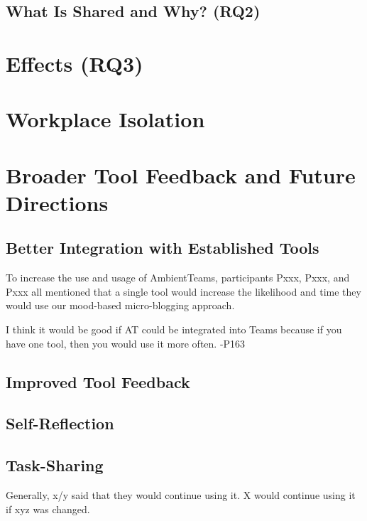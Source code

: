 \subsection{What Is Shared and Why? (RQ2)}





\section{Effects (RQ3)}
\label{section:effects}

\section{Workplace Isolation}
\label{section:workplace_isolation}

\section{Broader Tool Feedback and Future Directions}
\label{section:feedback_future_directions}

\subsection{Better Integration with Established Tools}
To increase the use and usage of AmbientTeams, participants Pxxx, Pxxx, and Pxxx all mentioned that a single tool would increase the likelihood and time they would use our mood-based micro-blogging approach.

\begin{displayquote}
    I think it would be good if AT could be integrated into Teams because if you have one tool, then you would use it more often. -P163
\end{displayquote}

\subsection{Improved Tool Feedback}

\subsection{Self-Reflection}

\subsection{Task-Sharing}


Generally, x/y said that they would continue using it. X would continue using it if xyz was changed.